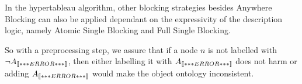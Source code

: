





  






 



\vspace{3cm}




In the hypertableau algorithm, other blocking strategies besides \textsf{Anywhere Blocking} can also
be applied dependant on the expressivity of the description logic, namely \textsf{Atomic Single
  Blocking} and \textsf{Full Single Blocking.}

\vspace{1cm}

So with a preprocessing step, we assure that if a node $n$ is not labelled with $\lnot
A_{\mathord{\left\llbracket***ERROR***\right\rrbracket}}$, then either labelling it with $A_{\mathord{\left\llbracket***ERROR***\right\rrbracket}}$ does not harm or adding
$A_{\mathord{\left\llbracket***ERROR***\right\rrbracket}}$ would make the object ontology inconsistent.

